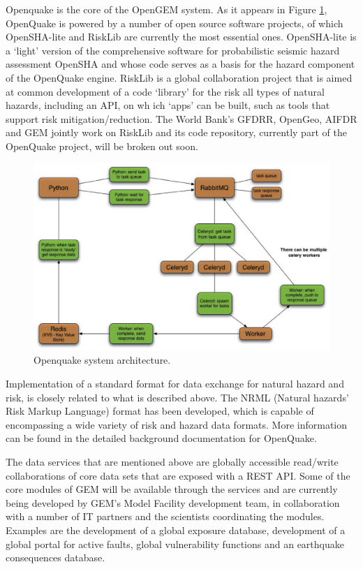 Openquake is the core of the OpenGEM system. 
%
As it appears in Figure \ref{fig:oq_it}, OpenQuake is powered by a 
number of open source software projects, of which OpenSHA-lite and 
RiskLib are currently the most essential ones. 
OpenSHA-lite is a ‘light’ version of the comprehensive software for 
probabilistic seismic hazard assessment OpenSHA and whose code serves
as a basis for the hazard component of the OpenQuake engine. RiskLib 
is a global collaboration project that is aimed at common development 
of a code ‘library’ for the risk all types of natural hazards, including
an API, on wh ich ‘apps’ can be built, such as tools that support risk
mitigation/reduction. The World Bank’s GFDRR, OpenGeo, AIFDR and GEM 
jointly work on RiskLib and its code repository, currently part of 
the OpenQuake project, will be broken out soon.
%
\begin{figure}
\includegraphics[width=\textwidth,angle=0]{./Figures/Part_Introduction/oq_system_architecture.eps}
\caption{Openquake system architecture.}
\label{fig:oq_it}
\end{figure}
%
Implementation of a standard format for data exchange for natural hazard
and risk,  is closely related to what is described above. The NRML 
(Natural hazards’ Risk Markup Language) format has been developed, which
is capable of encompassing a wide variety of risk and hazard data formats.
More information can be found in the detailed background documentation 
for OpenQuake.

The data services that are mentioned above are globally accessible 
read/write collaborations of core data sets that are exposed with a 
REST API. Some of the core modules of GEM will be available through 
the services and are currently being developed by GEM’s Model Facility 
development team, in collaboration with a number of IT partners and the 
scientists coordinating the modules. Examples are the development of a 
global exposure database, development of a global portal for active 
faults, global vulnerability functions and an earthquake consequences
database.




